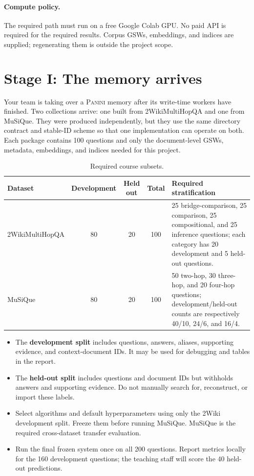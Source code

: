 \documentclass[11pt]{article}
\newcommand{\PANINI}{{\mdseries\textsc{Panini}}\xspace}
\begin{document}
\paragraph{Compute policy.}
The required path must run on a free Google Colab GPU. No paid API is required
for the required results. Corpus GSWs, embeddings, and indices
are supplied; regenerating them is outside the project scope.

\section{Stage I: The memory arrives}

Your team is taking over a \PANINI memory after its write-time workers have
finished. Two collections arrive: one built from 2WikiMultiHopQA and one from
MuSiQue. They were produced independently, but they use the same directory
contract and stable-ID scheme so that one implementation can operate on both.
Each package contains 100 questions and only the document-level GSWs, metadata,
embeddings, and indices needed for this project.

\begin{table}[h]
\centering
\small
\begin{tabularx}{\textwidth}{@{}l C C C Y@{}}
\toprule
\textbf{Dataset} & \textbf{Development} & \textbf{Held out} & \textbf{Total}
& \textbf{Required stratification}\\
\midrule
2WikiMultiHopQA & 80 & 20 & 100 &
25 bridge-comparison, 25 comparison, 25 compositional, and 25 inference
questions; each category has 20 development and 5 held-out questions.\\
MuSiQue & 80 & 20 & 100 &
50 two-hop, 30 three-hop, and 20 four-hop questions; development/held-out
counts are respectively 40/10, 24/6, and 16/4.\\
\bottomrule
\end{tabularx}
\caption{Required course subsets.}
\end{table}

\begin{itemize}
  \item The \textbf{development split} includes questions, answers, aliases,
        supporting evidence, and context-document IDs. It may be used for
        debugging and tables in the report.
  \item The \textbf{held-out split} includes questions and document IDs but
        withholds answers and supporting evidence. Do not manually search for,
        reconstruct, or import these labels.
  \item Select algorithms and default hyperparameters using only the 2Wiki
        development split. Freeze them before running MuSiQue. MuSiQue is the
        required cross-dataset transfer evaluation.
  \item Run the final frozen system once on all 200 questions. Report metrics
        locally for the 160 development questions; the teaching staff will
        score the 40 held-out predictions.
\end{itemize}
\end{document}
